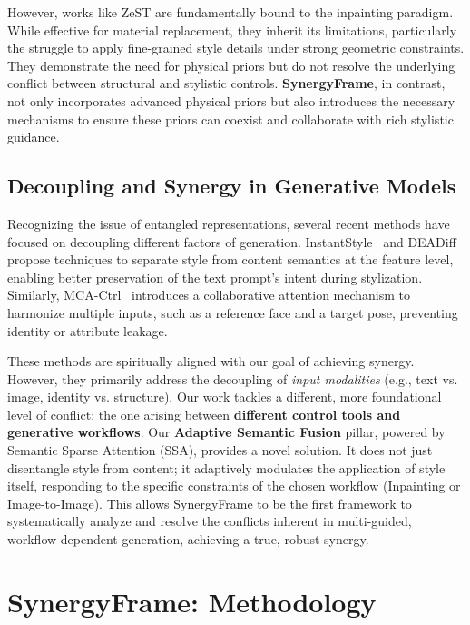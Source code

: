 \documentclass[letterpaper]{article} %
\begin{document}
However, works like ZeST are fundamentally bound to the inpainting paradigm. While effective for material replacement, they inherit its limitations, particularly the struggle to apply fine-grained style details under strong geometric constraints. They demonstrate the need for physical priors but do not resolve the underlying conflict between structural and stylistic controls. \textbf{SynergyFrame}, in contrast, not only incorporates advanced physical priors but also introduces the necessary mechanisms to ensure these priors can coexist and collaborate with rich stylistic guidance.

\subsection{Decoupling and Synergy in Generative Models}

Recognizing the issue of entangled representations, several recent methods have focused on decoupling different factors of generation. InstantStyle~\cite{wang2024instantstyle} and DEADiff~\cite{deadiff} propose techniques to separate style from content semantics at the feature level, enabling better preservation of the text prompt's intent during stylization. Similarly, MCA-Ctrl~\cite{yang2025multi} introduces a collaborative attention mechanism to harmonize multiple inputs, such as a reference face and a target pose, preventing identity or attribute leakage.

These methods are spiritually aligned with our goal of achieving synergy. However, they primarily address the decoupling of \textit{input modalities} (e.g., text vs. image, identity vs. structure). Our work tackles a different, more foundational level of conflict: the one arising between \textbf{different control tools and generative workflows}. Our \textbf{Adaptive Semantic Fusion} pillar, powered by Semantic Sparse Attention (SSA), provides a novel solution. It does not just disentangle style from content; it adaptively modulates the application of style itself, responding to the specific constraints of the chosen workflow (Inpainting or Image-to-Image). This allows SynergyFrame to be the first framework to systematically analyze and resolve the conflicts inherent in multi-guided, workflow-dependent generation, achieving a true, robust synergy.

\section{SynergyFrame: Methodology}
\label{sec:methodology}
\end{document}
